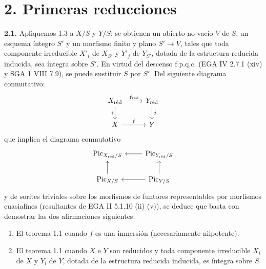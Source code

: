 
\section*{2. Primeras reducciones}

\textbf{2.1.} Apliquemos 1.3 a \(X/S\) y \(Y/S\): se obtienen un abierto no
vacío \(V\) de \(S\), un esquema íntegro \(S'\) y un morfismo finito y plano
\(S'\to V\), tales que toda componente irreducible \(X'_i\) de \(X_{S'}\) y
\(Y'_j\) de \(Y_{S'}\), dotada de la estructura reducida inducida, sea
íntegra sobre \(S'\). En virtud del descenso f.p.q.c. (EGA IV 2.7.1 (xiv) y
SGA 1 VIII 7.9), se puede sustituir \(S\) por \(S'\). Del siguiente diagrama
conmutativo:
\[
\begin{tikzcd}
X_{\red} \arrow[r,"f_{\red}"] \arrow[d,"i"'] & Y_{\red} \arrow[d,"j"]\\
X \arrow[r,"f"] & Y
\end{tikzcd}
\]
que implica el diagrama conmutativo
\[
\begin{tikzcd}
\Pic_{X_{\red}/S} & \Pic_{Y_{\red}/S} \arrow[l]\\
\Pic_{X/S} \arrow[u] & \Pic_{Y/S} \arrow[l] \arrow[u]
\end{tikzcd}
\]
y de sorites triviales sobre los morfismos de funtores representables por
morfismos cuasiafines (resultantes de EGA II 5.1.10 (ii) (v)), se deduce que
basta con demostrar las dos afirmaciones siguientes:
\begin{enumerate}[label=\Roman*.]
\item El teorema 1.1 cuando \(f\) es una inmersión (necesariamente
nilpotente).
\item El teorema 1.1 cuando \(X\) e \(Y\) son reducidos y toda componente
irreducible \(X_i\) de \(X\) y \(Y_i\) de \(Y\), dotada de la estructura
reducida inducida, es íntegra sobre \(S\).
\end{enumerate}

